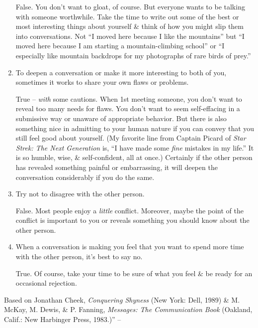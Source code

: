 \documentclass{article}
\numberwithin{equation}{section}
\begin{document}
\begin{enumerate}
	False. You don't want to gloat, of course. But everyone wants to be talking with someone worthwhile. Take the time to write out some of the best or most interesting things about yourself \& think of how you might slip them into conversations. Not ``I moved here because I like the mountains'' but ``I moved here because I am starting a mountain-climbing school'' or ``I especially like mountain backdrops for my photographs of rare birds of prey.''
	\item To deepen a conversation or make it more interesting to both of you, sometimes it works to share your own flaws or problems.
	
	True -- \textit{with} some cautions. When 1st meeting someone, you don't want to reveal too many needs for flaws. You don't want to seem self-effacing in a submissive way or unaware of appropriate behavior. But there is also something nice in admitting to your human nature if you can convey that you still feel good about yourself. (My favorite line from Captain Picard of \textit{Star Strek: The Next Generation} is, ``I have made some \textit{fine} mistakes in my life.'' It is so humble, wise, \& self-confident, all at once.) Certainly if the other person has revealed something painful or embarrassing, it will deepen the conversation considerably if you do the same.
	\item Try not to disagree with the other person.
	
	False. Most people enjoy a \textit{little} conflict. Moreover, maybe the point of the conflict is important to you or reveals something you should know about the other person.
	\item When a conversation is making you feel that you want to spend more time with the other person, it's best to say no.
	
	True. Of course, take your time to be sure of what you feel \& be ready for an occasional rejection.
\end{enumerate}
Based on Jonathan Cheek, \textit{Conquering Shyness} (New York: Dell, 1989) \& M. McKay, M. Dewis, \& P. Fanning, \textit{Messages: The Communication Book} (Oakland, Calif.: New Harbinger Press, 1983.)'' -- \cite[pp. 135--137]{Aron2013}
\end{document}
